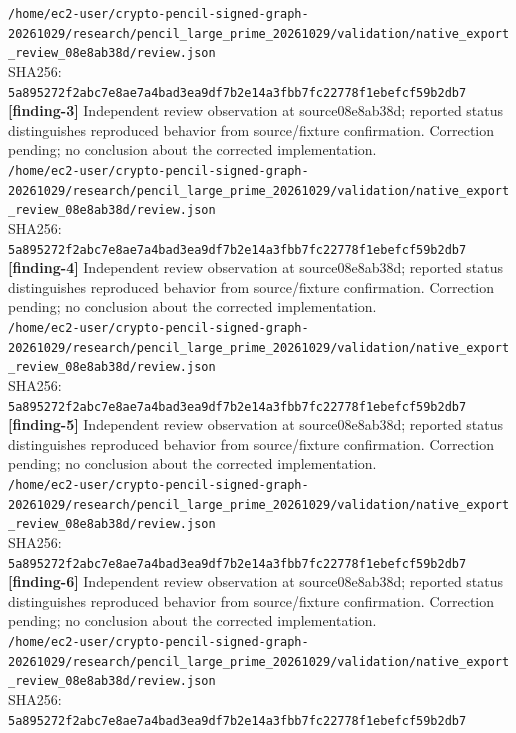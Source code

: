 \documentclass[11pt]{article}
\begin{document}
\texttt{/\allowbreak{}home/\allowbreak{}ec2-user/\allowbreak{}crypto-pencil-signed-graph-20261029/\allowbreak{}research/\allowbreak{}pencil\_large\_prime\_20261029/\allowbreak{}validation/\allowbreak{}native\_export\_review\_08e8ab38d/\allowbreak{}review.json}\\
SHA256: \texttt{5a895272f2abc7e8ae7a4bad3ea9df7b2e14a3fbb7fc22778f1ebefcf59b2db7}\\
\textbf{[finding-3]} Independent review observation at source08e8ab38d; reported status distinguishes reproduced behavior from source/fixture confirmation. Correction pending; no conclusion about the corrected implementation.\\
\texttt{/\allowbreak{}home/\allowbreak{}ec2-user/\allowbreak{}crypto-pencil-signed-graph-20261029/\allowbreak{}research/\allowbreak{}pencil\_large\_prime\_20261029/\allowbreak{}validation/\allowbreak{}native\_export\_review\_08e8ab38d/\allowbreak{}review.json}\\
SHA256: \texttt{5a895272f2abc7e8ae7a4bad3ea9df7b2e14a3fbb7fc22778f1ebefcf59b2db7}\\
\textbf{[finding-4]} Independent review observation at source08e8ab38d; reported status distinguishes reproduced behavior from source/fixture confirmation. Correction pending; no conclusion about the corrected implementation.\\
\texttt{/\allowbreak{}home/\allowbreak{}ec2-user/\allowbreak{}crypto-pencil-signed-graph-20261029/\allowbreak{}research/\allowbreak{}pencil\_large\_prime\_20261029/\allowbreak{}validation/\allowbreak{}native\_export\_review\_08e8ab38d/\allowbreak{}review.json}\\
SHA256: \texttt{5a895272f2abc7e8ae7a4bad3ea9df7b2e14a3fbb7fc22778f1ebefcf59b2db7}\\
\textbf{[finding-5]} Independent review observation at source08e8ab38d; reported status distinguishes reproduced behavior from source/fixture confirmation. Correction pending; no conclusion about the corrected implementation.\\
\texttt{/\allowbreak{}home/\allowbreak{}ec2-user/\allowbreak{}crypto-pencil-signed-graph-20261029/\allowbreak{}research/\allowbreak{}pencil\_large\_prime\_20261029/\allowbreak{}validation/\allowbreak{}native\_export\_review\_08e8ab38d/\allowbreak{}review.json}\\
SHA256: \texttt{5a895272f2abc7e8ae7a4bad3ea9df7b2e14a3fbb7fc22778f1ebefcf59b2db7}\\
\textbf{[finding-6]} Independent review observation at source08e8ab38d; reported status distinguishes reproduced behavior from source/fixture confirmation. Correction pending; no conclusion about the corrected implementation.\\
\texttt{/\allowbreak{}home/\allowbreak{}ec2-user/\allowbreak{}crypto-pencil-signed-graph-20261029/\allowbreak{}research/\allowbreak{}pencil\_large\_prime\_20261029/\allowbreak{}validation/\allowbreak{}native\_export\_review\_08e8ab38d/\allowbreak{}review.json}\\
SHA256: \texttt{5a895272f2abc7e8ae7a4bad3ea9df7b2e14a3fbb7fc22778f1ebefcf59b2db7}\\
\end{document}
